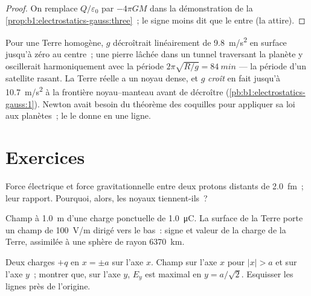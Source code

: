 \begin{proof}
On remplace $Q/\varepsilon_0$ par $-4\pi GM$ dans la démonstration de la
\cref{prop:b1:electrostatics-gauss:three}~; le signe moins dit que le 
entre (la  attire).
\end{proof}

\begin{example}\label{ex:b1:electrostatics-gauss:earth}
Pour une Terre homogène, $g$ décroîtrait linéairement de \qty{9.8}{m/s^2} en
surface jusqu'à zéro au centre~; une pierre lâchée dans un tunnel traversant
la planète y oscillerait harmoniquement avec la période $2\pi\sqrt{R/g} =
\qty{84}{min}$ --- la période d'un satellite rasant. La Terre réelle a un
noyau dense, et $g$ \emph{croît} en fait jusqu'à \qty{10.7}{m/s^2} à la
frontière noyau--manteau avant de décroître (\cref{pb:b1:electrostatics-gauss:1}).
Newton avait besoin du théorème des coquilles pour appliquer sa loi aux
planètes~; le  le donne en une ligne.
\end{example}

\section{Exercices}

\begin{exercise}[$\star$]\label{exo:b1:electrostatics-gauss:1}
Force électrique et force gravitationnelle entre deux protons distants de
\qty{2.0}{fm}~; leur rapport. Pourquoi, alors, les noyaux tiennent-ils~?
\end{exercise}

\begin{exercise}[$\star$]\label{exo:b1:electrostatics-gauss:2}
Champ à \qty{1.0}{m} d'une charge ponctuelle de \qty{1.0}{\micro C}. La
surface de la Terre porte un champ de \qty{100}{V/m} dirigé vers le bas~:
signe et valeur de la charge de la Terre, assimilée à une sphère de rayon \qty{6370}{km}.
\end{exercise}

\begin{exercise}[$\star$]\label{exo:b1:electrostatics-gauss:3}
Deux charges $+q$ en $x = \pm a$ sur l'axe $x$. Champ sur l'axe $x$ pour
$|x| > a$ et sur l'axe $y$~; montrer que, sur l'axe $y$, $E_y$ est maximal en
$y = a/\sqrt2$. Esquisser les lignes près de l'origine.
\end{exercise}

